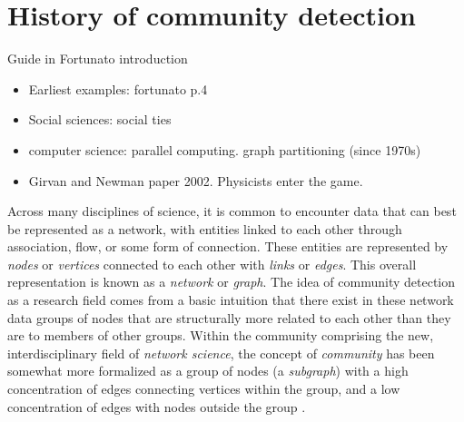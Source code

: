 \section{History of community
detection}\label{history-of-community-detection}

Guide in Fortunato introduction

\begin{itemize}
\tightlist
\item
  Earliest examples: fortunato p.4
\item
  Social sciences: social ties
\item
  computer science: parallel computing. graph partitioning (since 1970s)
\item
  Girvan and Newman paper 2002. Physicists enter the game.
\end{itemize}

Across many disciplines of science, it is common to encounter data that
can best be represented as a network, with entities linked to each other
through association, flow, or some form of connection. These entities
are represented by \emph{nodes} or \emph{vertices} connected to each
other with \emph{links} or \emph{edges}. This overall representation is
known as a \emph{network} or \emph{graph}. The idea of community
detection as a research field comes from a basic intuition that there
exist in these network data groups of nodes that are structurally more
related to each other than they are to members of other groups. Within
the community comprising the new, interdisciplinary field of
\emph{network science}, the concept of \emph{community} has been
somewhat more formalized as a group of nodes (a \emph{subgraph}) with a
high concentration of edges connecting vertices within the group, and a
low concentration of edges with nodes outside the group
\autocite{fortunato_community_2010}.
